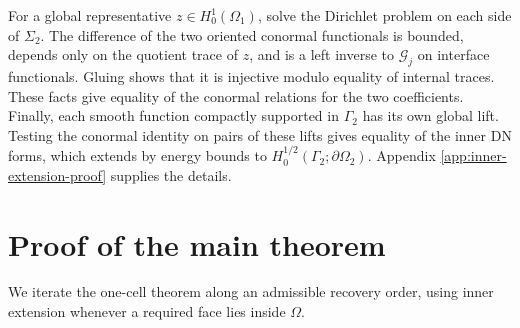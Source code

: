 \documentclass[10pt,a4paper]{amsart}
\begin{document}
For a global representative \(z\in H^1_0(\Omega_1)\), solve the Dirichlet
problem on each side of \(\Sigma_2\).  The difference of the two oriented
conormal functionals is bounded, depends only on the quotient trace of \(z\),
and is a left inverse to \(\mathcal G_j\) on interface functionals.  Gluing
shows that it is injective modulo equality of internal traces.  These facts give
equality of the conormal relations for the two coefficients.  Finally, each
smooth function compactly supported in \(\Gamma_2\) has its own global lift.
Testing the conormal identity on pairs of these lifts gives equality of the
inner DN forms, which extends by energy bounds to
\(H^{1/2}_0(\Gamma_2;\partial\Omega_2)\).  Appendix
\ref{app:inner-extension-proof} supplies the details.

\section{Proof of the main theorem}
\label{sec:global-uniqueness}

We iterate the one-cell theorem along an admissible recovery order, using
inner extension whenever a required face lies inside \(\Omega\).
\end{document}
